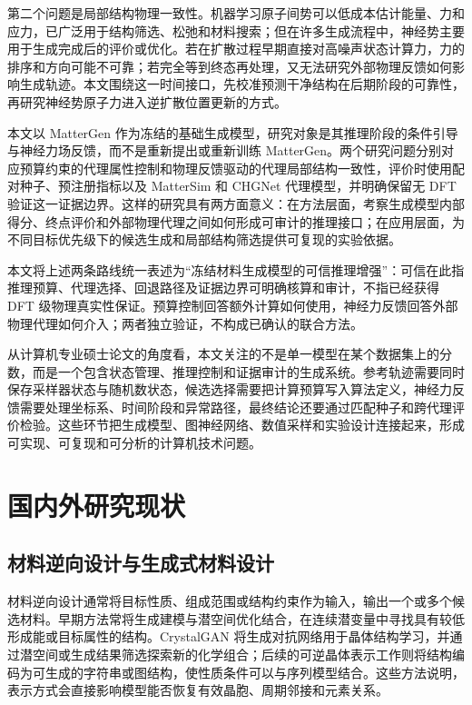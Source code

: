 第二个问题是局部结构物理一致性。机器学习原子间势可以低成本估计能量、力和应力，已广泛用于结构筛选、松弛和材料搜索\citep{merchant2023,chen2022,batzner2022,batatia2022,deng2023,yang2024mattersim}；但在许多生成流程中，神经势主要用于生成完成后的评价或优化。若在扩散过程早期直接对高噪声状态计算力，力的排序和方向可能不可靠；若完全等到终态再处理，又无法研究外部物理反馈如何影响生成轨迹。本文围绕这一时间接口，先校准预测干净结构在后期阶段的可靠性，再研究神经势原子力进入逆扩散位置更新的方式。

本文以 MatterGen 作为冻结的基础生成模型，研究对象是其推理阶段的条件引导与神经力场反馈，而不是重新提出或重新训练 MatterGen。两个研究问题分别对应预算约束的代理属性控制和物理反馈驱动的代理局部结构一致性，评价时使用配对种子、预注册指标以及 Matter\allowbreak Sim 和 CHGNet 代理模型，并明确保留无 DFT 验证这一证据边界。这样的研究具有两方面意义：在方法层面，考察生成模型内部得分、终点评价和外部物理代理之间如何形成可审计的推理接口；在应用层面，为不同目标优先级下的候选生成和局部结构筛选提供可复现的实验依据。

本文将上述两条路线统一表述为“冻结材料生成模型的可信推理增强”：可信在此指推理预算、代理选择、回退路径及证据边界可明确核算和审计，不指已经获得 DFT 级物理真实性保证。预算控制回答额外计算如何使用，神经力反馈回答外部物理代理如何介入；两者独立验证，不构成已确认的联合方法。


从计算机专业硕士论文的角度看，本文关注的不是单一模型在某个数据集上的分数，而是一个包含状态管理、推理控制和证据审计的生成系统。参考轨迹需要同时保存采样器状态与随机数状态，候选选择需要把计算预算写入算法定义，神经力反馈需要处理坐标系、时间阶段和异常路径，最终结论还要通过匹配种子和跨代理评价检验。这些环节把生成模型、图神经网络、数值采样和实验设计连接起来，形成可实现、可复现和可分析的计算机技术问题。

\section{国内外研究现状}

\subsection{材料逆向设计与生成式材料设计}

材料逆向设计通常将目标性质、组成范围或结构约束作为输入，输出一个或多个候选材料。早期方法常将生成建模与潜空间优化结合，在连续潜变量中寻找具有较低形成能或目标属性的结构。CrystalGAN 将生成对抗网络用于晶体结构学习，并通过潜空间或生成结果筛选探索新的化学组合\citep{nouira2018}；后续的可逆晶体表示工作则将结构编码为可生成的字符串或图结构，使性质条件可以与序列模型结合\citep{xiao2023}。这些方法说明，表示方式会直接影响模型能否恢复有效晶胞、周期邻接和元素关系。

